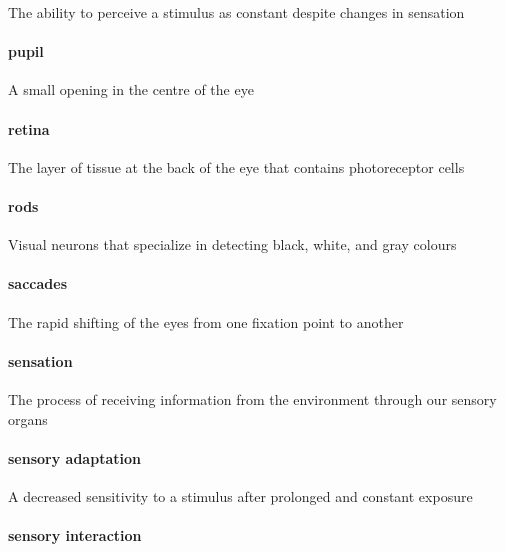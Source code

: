 \documentclass[
]{krantz}
\begin{document}
The ability to perceive a stimulus as constant despite changes in sensation

\paragraph*{pupil}\label{pupil}

A small opening in the centre of the eye

\paragraph*{retina}\label{retina}

The layer of tissue at the back of the eye that contains photoreceptor cells

\paragraph*{rods}\label{rods}

Visual neurons that specialize in detecting black, white, and gray colours

\paragraph*{saccades}\label{saccades}

The rapid shifting of the eyes from one fixation point to another

\paragraph*{sensation}\label{sensation}

The process of receiving information from the environment through our sensory organs

\paragraph*{sensory adaptation}\label{sensory-adaptation}

A decreased sensitivity to a stimulus after prolonged and constant exposure

\paragraph*{sensory interaction}\label{sensory-interaction}
\end{document}
